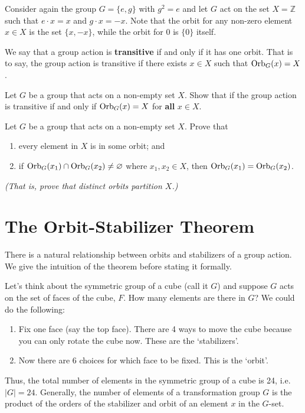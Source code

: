 \begin{example}
    Consider again the group $G = \{e, g\}$ with $g^2 = e$ and let $G$ act on the set $X = \mathbb{Z}$ such that $e \cdot x = x$ and $g \cdot x = -x$. Note that the orbit for any non-zero element $x \in X$ is the set $\{x, -x\}$, while the orbit for 0 is $\{0\}$ itself.
\end{example}

We say that a group action is \textbf{transitive} if and only if it has one orbit. That is to say, the group action is transitive if there exists $x \in X$ such that $\mathrm{Orb}_{G}(x) = X$.

\begin{exercise}
    Let $G$ be a group that acts on a non-empty set $X$. Show that if the group action is transitive if and only if $\mathrm{Orb}_{G}(x) = X$ for \textbf{all} $x \in X$.
\end{exercise}

\begin{exercise}\label{exercise-distinct-orbits-partition-set}
    Let $G$ be a group that acts on a non-empty set $X$. Prove that
    \begin{enumerate}[label=(\alph*)]
        \item every element in $X$ is in some orbit; and
        \item if $\mathrm{Orb}_{G}(x_1) \cap \mathrm{Orb}_{G}(x_2) \neq \varnothing$ where $x_1, x_2 \in X$, then $\mathrm{Orb}_{G}(x_1) = \mathrm{Orb}_{G}(x_2)$.
    \end{enumerate}
    \textit{(That is, prove that distinct orbits partition $X$.)}
\end{exercise}

\section{The Orbit-Stabilizer Theorem}
There is a natural relationship between orbits and stabilizers of a group action. We give the intuition of the theorem before stating it formally.

Let's think about the symmetric group of a cube (call it $G$) and suppose $G$ acts on the set of faces of the cube, $F$. How many elements are there in $G$? We could do the following:
\begin{enumerate}
    \item Fix one face (say the top face). There are 4 ways to move the cube because you can only rotate the cube now. These are the `stabilizers'.
    \item Now there are 6 choices for which face to be fixed. This is the `orbit'.
\end{enumerate}
Thus, the total number of elements in the symmetric group of a cube is 24, i.e. $|G| = 24$. Generally, the number of elements of a transformation group $G$ is the product of the orders of the stabilizer and orbit of an element $x$ in the $G$-set.

